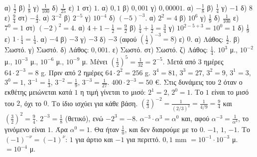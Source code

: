  α) $\frac{1}{2}$ \quad β) $\frac{1}{8}$ \quad γ) $\frac{1}{100}$ \quad δ) $\frac{1}{25}$ \quad ε) $1$ \quad στ) $1$.
 α) $0{,}1$ \quad β) $0{,}001$ \quad γ) $0{,}00001$.
 α) $-\frac{1}{8}$ \quad β) $\frac{1}{4}$ \quad γ) $-1$ \quad δ) $8$ \quad ε) $\frac{9}{4}$ \quad στ) $-\frac{4}{3}$.
 α) $3^{-2}$ \quad β) $2^{-5}$ \quad γ) $10^{-4}$ \quad δ) $(-5)^{-3}$.
 α) $2^2=4$ \quad β) $10^6$ \quad γ) $\frac{1}{9}$ \quad δ) $\frac{1}{100}$ \quad ε) $7^0=1$ \quad στ) $(-2)^2=4$.
 α) $4+1-\frac{1}{2}=\frac{9}{2}$ \quad β) $\frac{1}{4}+\frac{1}{2}=\frac{3}{4}$ \quad γ) $10^{2-5+3}=10^0=1$ \quad δ) $\frac{1}{9}$ \quad ε) $1\cdot\frac{1}{4}=\frac{1}{4}$.
 α) $-4$ \quad β) $-3$ \quad γ) $-3$ \quad δ) $-3$ (αφού $\left(\frac{1}{2}\right)^{-3}=8$) \quad ε) $0$.
 α) Λάθος: $\frac{1}{2}$. β) Σωστό. γ) Σωστό. δ) Λάθος: $0{,}001$. ε) Σωστό. στ) Σωστό. ζ) Λάθος: $\frac{1}{4}$.
 $10^3$ μ., $10^{-2}$ μ., $10^{-3}$ μ., $10^{-6}$ μ., $10^{-9}$ μ.
 Μένει $\left(\frac{1}{2}\right)^5=\frac{1}{32}=2^{-5}$.
 Μετά από $3$ ημέρες $64\cdot2^{-3}=8$ g. Πριν από $2$ ημέρες $64\cdot2^2=256$ g.
 $3^4=81$, $3^3=27$, $3^2=9$, $3^1=3$, $3^0=1$, $3^{-1}=\frac{1}{3}$, $3^{-2}=\frac{1}{9}$, $3^{-3}=\frac{1}{27}$.
 $400\cdot2^{-3}=50$ €.
 Στις δυνάμεις του $2$ όταν ο εκθέτης μειώνεται κατά $1$ η τιμή γίνεται το μισό: $2^1=2$, $2^0=1$. Το $1$ είναι το μισό του $2$, όχι το $0$. Το ίδιο ισχύει για κάθε βάση.
 $\left(\frac{2}{3}\right)^{-2}=\frac{1}{(2/3)^2}=\frac{1}{4/9}=\frac{9}{4}$ και $\left(\frac{3}{2}\right)^2=\frac{9}{4}$.
 $2^{-3}=\frac{1}{8}$ (θετικό), ενώ $-2^3=-8$.
 $\alpha^{-3}\cdot\alpha^3=\alpha^0$ και, αφού $\alpha^{-3}=\frac{1}{\alpha^3}$, το γινόμενο είναι $1$. Άρα $\alpha^0=1$.
 Θα ήταν $\frac{1}{0}$, και δεν διαιρούμε με το $0$.
 $-1$, $1$, $-1$. Το $(-1)^{-\nu}=(-1)^\nu$: $1$ για άρτιο και $-1$ για περιττό.
 $0{,}1$ mm $=10^{-1}\cdot10^{-3}$ μ. $=10^{-4}$ μ.
